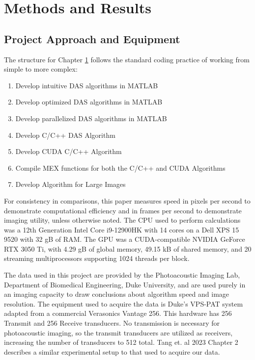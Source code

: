 \chapter{Methods and Results}
\label{Methodology}
\graphicspath{{C:/Users/cason/OneDrive/Documents/PSU/Project/02_MATLAB/05_DataOut/}}

\lstset{language=Matlab, style=Matlab-editor}

\section{Project Approach and Equipment}
\label{chapter3:approach}

    The structure for Chapter \ref{Methodology} follows the standard coding practice of working from simple to more complex:
    \begin{enumerate}
        \item Develop intuitive DAS algorithms in MATLAB
        \item Develop optimized DAS algorithms in MATLAB
        \item Develop parallelized DAS algorithms in MATLAB
        \item Develop C/C++ DAS Algorithm
        \item Develop CUDA C/C++ Algorithm
        \item Compile MEX functions for both the C/C++ and CUDA Algorithms
        \item Develop Algorithm for Large Images
    \end{enumerate}

    For consistency in comparisons, this paper measures speed in pixels per second to demonstrate computational efficiency and in frames per second to demonstrate imaging utility, unless otherwise noted. The CPU used to perform calculations was a 12th Generation Intel Core i9-12900HK with 14 cores on a Dell XPS 15 9520 with 32 gB of RAM. The GPU was a CUDA-compatible NVIDIA GeForce RTX 3050 Ti, with 4.29 gB of global memory, 49.15 kB of shared memory, and 20 streaming multiprocessors supporting 1024 threads per block.

    The data used in this project are provided by the Photoacoustic Imaging Lab, Department of Biomedical Engineering, Duke University, and are used purely in an imaging capacity to draw conclusions about algorithm speed and image resolution. The equipment used to acquire the data is Duke's VPS-PAT system adapted from a commercial Verasonics Vantage 256. This hardware \cite{pmgroupVantageSystems2015} has 256 Transmit and 256 Receive transducers. No transmission is necessary for photoacoustic imaging, so the transmit transducers are utilized as receivers, increasing the number of transducers to 512 total. Tang et. al 2023 Chapter 2 \cite{tangHighfidelityDeepFunctional2023a} describes a similar experimental setup to that used to acquire our data.

